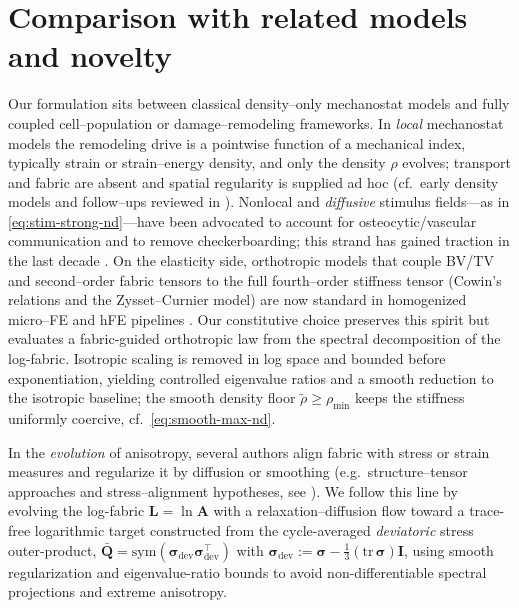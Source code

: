 \section*{Comparison with related models and novelty}
\label{sec:related-novelty}
Our formulation sits between classical density--only mechanostat models and fully coupled cell--population or damage--remodeling frameworks. In \emph{local} mechanostat models the remodeling drive is a pointwise function of a mechanical index, typically strain or strain--energy density, and only the density $\rho$ evolves; transport and fabric are absent and spatial regularity is supplied ad hoc (cf.\ early density models and follow--ups reviewed in \cite{Giorgio2019_MechanicallyDrivenBiological}). Nonlocal and \emph{diffusive} stimulus fields---as in \eqref{eq:stim-strong-nd}---have been advocated to account for osteocytic/vascular communication and to remove checkerboarding; this strand has gained traction in the last decade \cite{Giorgio2019_MechanicallyDrivenBiological, Addessi2024_BoneRemodelingApproach}. On the elasticity side, orthotropic models that couple BV/TV and second--order fabric tensors to the full fourth--order stiffness tensor (Cowin's relations and the Zysset--Curnier model) are now standard in homogenized micro--FE and hFE pipelines \cite{Cowin1985_RelationshipBetweenElasticity, Turner1990_FabricDependenceOrthotropic, Zysset1995_AlternativeModelAnisotropic, Maquer2015_BoneVolumeFraction, Maquer2017_NotOnlyStiffness}. Our constitutive choice preserves this spirit but evaluates a fabric-guided orthotropic law from the spectral decomposition of the log-fabric. Isotropic scaling is removed in log space and bounded before exponentiation, yielding controlled eigenvalue ratios and a smooth reduction to the isotropic baseline; the smooth density floor $\widetilde\rho\ge\rho_{\min}$ keeps the stiffness uniformly coercive, cf.\ \eqref{eq:smooth-max-nd}.

In the \emph{evolution} of anisotropy, several authors align fabric with stress or strain measures and regularize it by diffusion or smoothing (e.g.\ structure--tensor approaches and stress--alignment hypotheses, see \cite{Kuo2007_QuantifyingAnisotropyTrabecular, Rietbergen2015_NovelApproachEstimate, Dutra2016_QuantifyingTrabecularBone}). We follow this line by evolving the log-fabric $\mathbf{L}=\ln\mathbf{A}$ with a relaxation--diffusion flow toward a trace-free logarithmic target constructed from the cycle-averaged \emph{deviatoric} stress outer-product,
\(
\bar{\mathbf{Q}}=\mathrm{sym}(\boldsymbol{\sigma}_{\mathrm{dev}}\boldsymbol{\sigma}_{\mathrm{dev}}^{\!\top})
\)
with $\boldsymbol{\sigma}_{\mathrm{dev}}:=\boldsymbol{\sigma}-\tfrac13(\mathrm{tr}\,\boldsymbol{\sigma})\mathbf{I}$, using smooth regularization and eigenvalue-ratio bounds to avoid non-differentiable spectral projections and extreme anisotropy.


